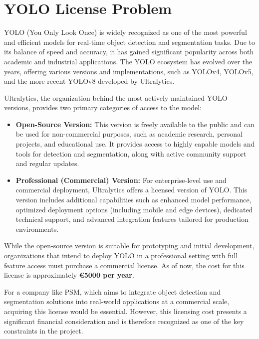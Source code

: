\documentclass[11pt,a4paper]{article}
\begin{document}
\section{YOLO License Problem}

YOLO (You Only Look Once) is widely recognized as one of the most powerful and efficient models for real-time object detection and segmentation tasks. Due to its balance of speed and accuracy, it has gained significant popularity across both academic and industrial applications. The YOLO ecosystem has evolved over the years, offering various versions and implementations, such as YOLOv4, YOLOv5, and the more recent YOLOv8 developed by Ultralytics.

Ultralytics, the organization behind the most actively maintained YOLO versions, provides two primary categories of access to the model:

\begin{itemize}
  \item \textbf{Open-Source Version:} This version is freely available to the public and can be used for non-commercial purposes, such as academic research, personal projects, and educational use. It provides access to highly capable models and tools for detection and segmentation, along with active community support and regular updates.
  
  \item \textbf{Professional (Commercial) Version:} For enterprise-level use and commercial deployment, Ultralytics offers a licensed version of YOLO. This version includes additional capabilities such as enhanced model performance, optimized deployment options (including mobile and edge devices), dedicated technical support, and advanced integration features tailored for production environments.
\end{itemize}

While the open-source version is suitable for prototyping and initial development, organizations that intend to deploy YOLO in a professional setting with full feature access must purchase a commercial license. As of now, the cost for this license is approximately \textbf{€5000 per year}. 

For a company like PSM, which aims to integrate object detection and segmentation solutions into real-world applications at a commercial scale, acquiring this license would be essential. However, this licensing cost presents a significant financial consideration and is therefore recognized as one of the key constraints in the project.
\end{document}
